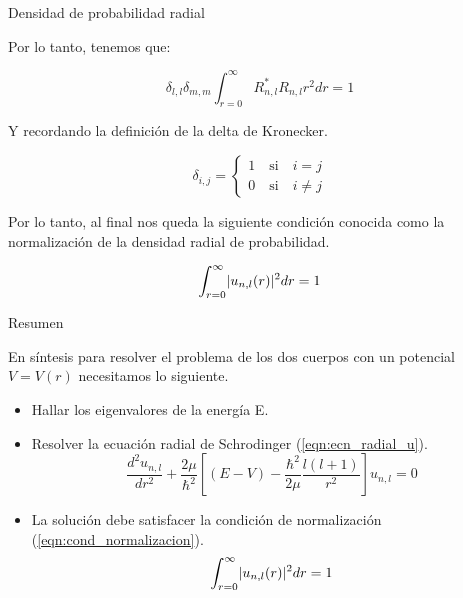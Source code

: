 \begin{frame}{Densidad de probabilidad radial}

    Por lo tanto, tenemos que:

    \begin{equation}
        \delta_{l,l} \delta_{m,m}
        \displaystyle\int_{r=0}^{\infty} 
        R_{n,l}^{*} R_{n,l}
        r^2  dr  = 1
    \end{equation}

    Y recordando la definición de la delta de Kronecker.

    \begin{equation}
        \delta_{i,j} = \begin{cases}
            1 \quad \text{si} \quad i=j \\
            0 \quad \text{si} \quad i \ne j
        \end{cases}
    \end{equation}

    Por lo tanto, al final nos queda la siguiente condición conocida como 
    la normalización de la densidad radial de probabilidad.

    \begin{equation}
        \displaystyle\int_{r=0}^{\infty} 
        \lvert u_{n,l} (r)\rvert^2
        dr  = 1
        \label{eqn:cond_normalizacion}
    \end{equation}

\end{frame}

\begin{frame}{Resumen}

    En síntesis para resolver el problema de los dos cuerpos con un potencial $V=V(r)$ necesitamos lo siguiente.

    \begin{itemize}

        \item Hallar los eigenvalores de la energía E.

        \item Resolver la ecuación radial de Schrodinger (\ref{eqn:ecn_radial_u}).
        $$
            \frac{d^2 u_{n,l}}{dr^2} + \frac{2\mu}{\hbar^2} \left[
                (E-V) - \frac{\hbar^2}{2\mu} \frac{l(l+1)}{r^2}
            \right] u_{n,l} = 0
        $$
        
        \item  La solución debe satisfacer la condición de normalización (\ref{eqn:cond_normalizacion}).
        $$
            \displaystyle\int_{r=0}^{\infty} 
            \lvert u_{n,l} (r)\rvert^2
            dr  = 1
        $$
        
    \end{itemize}

\end{frame}




